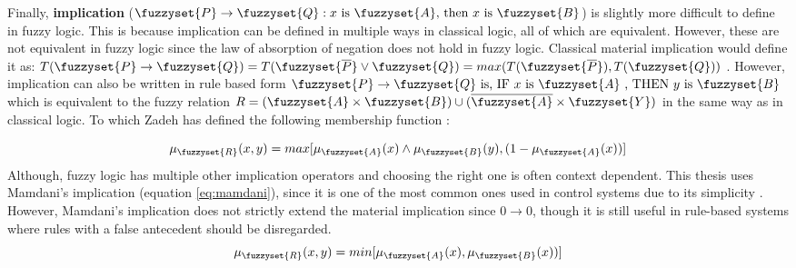 Finally, \textbf{implication}  ($\fuzzyset{P}\to \fuzzyset{Q}: x \text{ is } \fuzzyset{A} \text{, then }x \text{ is } \fuzzyset{B}$) is slightly more difficult to define in fuzzy logic. This is because implication can be defined in multiple ways in classical logic, all of which are equivalent. However, these are not equivalent in fuzzy logic since the law of absorption of negation does not hold in fuzzy logic. Classical material implication would  define it as: $T(\fuzzyset{P}\to \fuzzyset{Q})=T(\fuzzyset{\overline{P}}\lor\fuzzyset{Q})=max(T(\fuzzyset{\overline{P}}),T(\fuzzyset{Q}))$ \cite{oh1987properties}.
However, implication can also be written in rule based form  $\fuzzyset{P} \to \fuzzyset{Q} \text{ is,  IF } x \text{ is } \fuzzyset{A} \text{ , THEN } y \text{ is } \fuzzyset{B}$ which is equivalent to the fuzzy relation $R=(\fuzzyset{A}\times\fuzzyset{B})\cup (\overline{\fuzzyset{A}}\times \fuzzyset{Y})$ in the same way as in classical logic.
To which Zadeh has defined the following membership function \cite{oh1987properties}:

\begin{equation}
    \mu_{\fuzzyset{R}}(x,y)=max[\mu_{\fuzzyset{A}}(x)\land\mu_{\fuzzyset{B}}(y),(1-\mu_{\fuzzyset{A}}(x))]
    \label{eq:implication-orig}
\end{equation}
Although, fuzzy logic has multiple other implication operators and choosing the right one is often context dependent. This thesis uses Mamdani's implication (equation \ref{eq:mamdani}), since it is one of the most common ones used in control systems  due to its simplicity \cite{ross2009fuzzy}. However, Mamdani's implication does not strictly extend the material implication since $0 \to 0$, though it is still useful in rule-based systems where rules with a false antecedent should be disregarded.
\begin{equation}
    \mu_{\fuzzyset{R}}(x,y)=min[\mu_{\fuzzyset{A}}(x),\mu_{\fuzzyset{B}}(x))]
    \label{eq:mamdani}
\end{equation}


